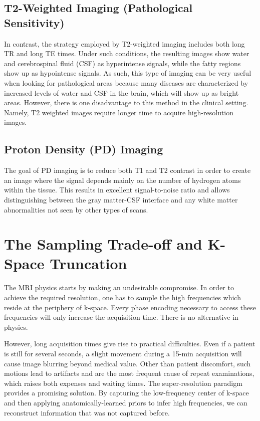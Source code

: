 \subsection{T2-Weighted Imaging (Pathological Sensitivity)}
In contrast, the strategy employed by T2-weighted imaging includes both long TR and long TE times. Under such conditions, the resulting images show water and cerebrospinal fluid (CSF) as hyperintense signals, while the fatty regions show up as hypointense signals. As such, this type of imaging can be very useful when looking for pathological areas because many diseases are characterized by increased levels of water and CSF in the brain, which will show up as bright areas. However, there is one disadvantage to this method in the clinical setting. Namely, T2 weighted images require longer time to acquire high-resolution images.

\subsection{Proton Density (PD) Imaging}
The goal of PD imaging is to reduce both T1 and T2 contrast in order to create an image where the signal depends mainly on the number of hydrogen atoms within the tissue. This results in excellent signal-to-noise ratio and allows distinguishing between the gray matter-CSF interface and any white matter abnormalities not seen by other types of scans.

\section{The Sampling Trade-off and K-Space Truncation}
The MRI physics starts by making an undesirable compromise. In order to achieve the required resolution, one has to sample the high frequencies which reside at the periphery of k-space. Every phase encoding necessary to access these frequencies will only increase the acquisition time. There is no alternative in physics.

However, long acquisition times give rise to practical difficulties. Even if a patient is still for several seconds, a slight movement during a 15-min acquisition will cause image blurring beyond medical value. Other than patient discomfort, such motions lead to artifacts and are the most frequent cause of repeat examinations, which raises both expenses and waiting times. The super-resolution paradigm provides a promising solution. By capturing the low-frequency center of k-space and then applying anatomically-learned priors to infer high frequencies, we can reconstruct information that was not captured before.

